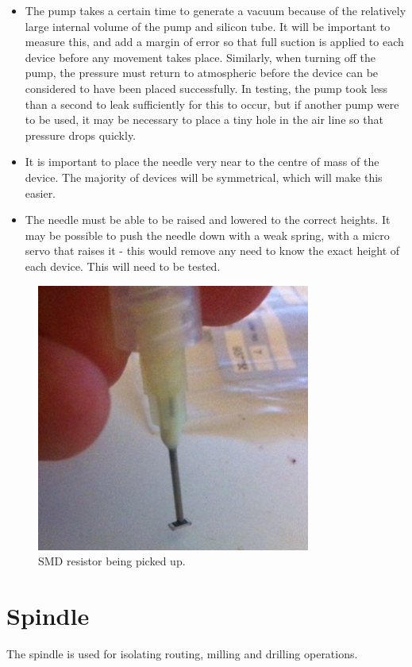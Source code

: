 \begin{itemize}
	\item	The pump takes a certain time to generate a vacuum because of the relatively large internal volume of the pump
		and silicon tube. It will be important to measure this, and add a margin of error so that full suction is applied
		to each device before any movement takes place. Similarly, when turning off the pump, the pressure must return to
		atmospheric before the device can be considered to have been placed successfully. In testing, the pump took
		less than a second to leak sufficiently for this to occur, but if another pump were to be used, it may be necessary
		to place a tiny hole in the air line so that pressure drops quickly.
	\item	It is important to place the needle very near to the centre of mass of the device. The majority of devices will be
		symmetrical, which will make this easier.
	\item	The needle must be able to be raised and lowered to the correct heights. It may be possible to push the needle down
		with a weak spring, with a micro servo that raises it - this would remove any need to know the exact height of each
		device. This will need to be tested.
\end{itemize}

\begin{figure}[ht!]
\centering
\includegraphics[width=90mm]{resources/needle_with_resistor.jpg}
\caption{SMD resistor being picked up.}
\label{overflow}
\end{figure}


\section{Spindle}
The spindle is used for isolating routing, milling and drilling operations.

